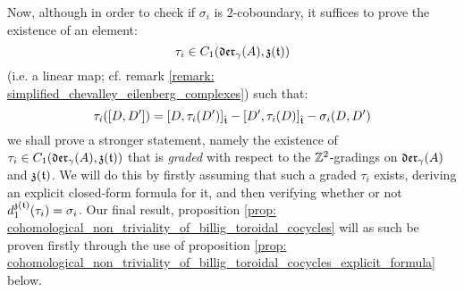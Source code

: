         Now, although in order to check if $\sigma_i$ is $2$-coboundary, it suffices to prove the existence of an element:
            $$\tau_i \in C_1(\mathfrak{der}_{\gamma}(A), \mathfrak{z}(\mathfrak{t}))$$
        (i.e. a linear map; cf. remark \ref{remark: simplified_chevalley_eilenberg_complexes}) such that:
            $$\tau_i([D, D']) = [D, \tau_i(D')]_{\hat{\mathfrak{t}}} - [D', \tau_i(D)]_{\hat{\mathfrak{t}}} - \sigma_i(D, D')$$
        we shall prove a stronger statement, namely the existence of $\tau_i \in C_1(\mathfrak{der}_{\gamma}(A), \mathfrak{z}(\mathfrak{t}))$ that is \textit{graded} with respect to the $\mathbb{Z}^2$-gradings on $\mathfrak{der}_{\gamma}(A)$ and $\mathfrak{z}(\mathfrak{t})$. We will do this by firstly assuming that such a graded $\tau_i$ exists, deriving an explicit closed-form formula for it, and then verifying whether or not $d_1^{\mathfrak{z}(\mathfrak{t})}(\tau_i) = \sigma_i$. Our final result, proposition \ref{prop: cohomological_non_triviality_of_billig_toroidal_cocycles} will as such be proven firstly through the use of proposition \ref{prop: cohomological_non_triviality_of_billig_toroidal_cocycles_explicit_formula} below.


